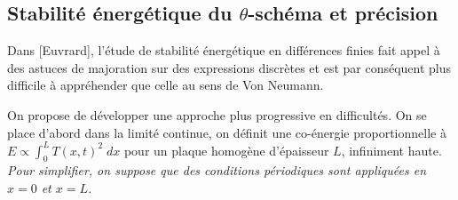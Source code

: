 \documentclass[a4paper, 12pt]{article}
\begin{document}
 \subsection{Stabilité énergétique du $\theta$-schéma et précision}

Dans [Euvrard], l'étude de stabilité énergétique en différences finies fait
appel à des astuces de majoration sur des expressions discrètes et est par conséquent
plus difficile à appréhender que celle au sens de Von Neumann.

On propose de développer une approche plus progressive en difficultés.
On se place d'abord dans la limité continue, on définit une co-énergie proportionnelle
à  $E \propto \int_0^L T(x, t)^2 \; dx$ pour un plaque homogène d'épaisseur $L$, infiniment haute.
{\it Pour simplifier, on suppose que des conditions périodiques sont appliquées
en $x=0$ et $x=L$.}
\end{document}
